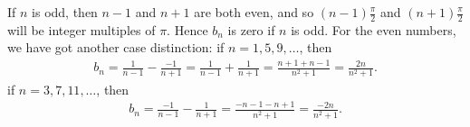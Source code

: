 \documentclass[11pt]{article}
\begin{document}
\begin{solution}
\begin{itemize}
    If $n$ is odd, then $n-1$ and $n+1$ are both even, and so $(n-1)\frac{\pi}{2}$ and $(n+1)\frac{\pi}{2}$ will be integer multiples of $\pi$. 
    Hence $b_n$ is zero if $n$ is odd. 
    For the even numbers, we have got another case distinction:
    if $n=1,5,9,\dots$, then 
    \begin{align*}
        b_n = \frac{1}{n-1} - \frac{-1}{n+1} = \frac{1}{n-1} + \frac{1}{n+1} = \frac{n+1+n-1}{n^2+1} = \frac{2n}{n^2+1}.
    \end{align*}
    if $n=3,7,11,\dots$, then 
    \begin{align*}
        b_n = \frac{-1}{n-1} - \frac{1}{n+1} = \frac{-n-1-n+1}{n^2+1} = \frac{-2n}{n^2+1}.
    \end{align*}
    

    
\end{itemize}
\end{solution}
\end{document}
